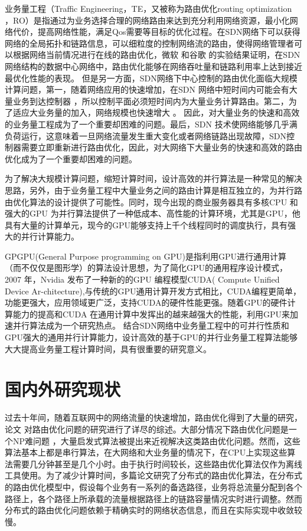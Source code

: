 \documentclass[master]{thesis-uestc}
\begin{document}
业务量工程（Traffic Engineering，TE，又被称为路由优化routing optimization ，RO）是指通过为业务选择合理的网络路由来达到充分利用网络资源，最小化网络代价，提高网络性能，满足Qos需要等目标的优化过程。在SDN网络下可以获得网络的全局拓扑和链路信息，可以细粒度的控制网络流的路由，使得网络管理者可以根据网络当前情况进行在线的路由优化，微软 \cite{Microsoft}和谷歌 \cite{Google}的实验结果证明，在SDN网络结构的数据中心网络中，路由优化能够在网络吞吐量和链路利用率上达到接近最优化性能的表现。
但是另一方面，SDN网络下中心控制的路由优化面临大规模计算问题，第一，随着网络应用的快速增加，在SDN 网络中短时间内可能会有大量业务到达控制器 \cite{application}，所以控制平面必须短时间内为大量业务计算路由。第二，为了适应大业务量的加入，网络规模也快速增大\cite{5G} \cite{DCN}。 因此，对大量业务的快速和高效的业务量工程成为了一个重要却困难的问题。最后，SDN 技术使网络能够几乎满负荷运行\cite{Secondrouting}，这意味着一旦网络流量发生重大变化或者网络链路出现故障，SDN控制器需要立即重新进行路由优化，因此，对大网络下大量业务的快速和高效的路由优化成为了一个重要却困难的问题。

为了解决大规模计算问题，缩短计算时间，设计高效的并行算法是一种常见的解决思路，另外，由于业务量工程中大量业务之间的路由计算是相互独立的，为并行路由优化算法的设计提供了可能性。同时，现今出现的商业服务器具有多核CPU 和强大的GPU 为并行算法提供了一种低成本、高性能的计算环境，尤其是GPU，他具有大量的计算单元，现今的GPU能够支持上千个线程同时的调度执行，具有强大的并行计算能力。

GPGPU(General Purpose programming on GPU)是指利用GPU进行通用计算（而不仅仅是图形学）的算法设计思想，为了简化GPU的通用程序设计模式，2007 年，Nvidia 发布了一种新的的GPU 编程模型CUDA( Compute Unified Device Ar-chitecture)\cite{CUDA},与传统的GPU通用计算开发方式相比，CUDA编程更简单，功能更强大，应用领域更广泛，支持CUDA的硬件性能更强。随着GPU的硬件计算能力的提高和CUDA 在通用计算中发挥出的越来越强大的性能，利用GPU来加速并行算法成为一个研究热点\cite{CUDAR}。
结合SDN网络中业务量工程中的可并行性质和GPU强大的通用并行计算能力，设计高效的基于GPU的并行业务量工程算法能够大大提高业务量工程计算时间，具有很重要的研究意义。
\section{国内外研究现状}
过去十年间，随着互联网中的网络流量的快速增加，路由优化得到了大量的研究，论文 \cite{TESurvey, TEDef, TESurvey1}对路由优化问题的研究进行了详尽的综述。大部分情况下路由优化问题是一个NP难问题 \cite{NP, multi-commodity}，大量启发式算法\cite{TESurvey, TEDef, TESurvey1}被提出来近视解决这类路由优化问题。然而，这些算法基本上都是串行算法，在大网络和大业务量的情况下，在CPU上实现这些算法需要几分钟甚至是几个小时\cite{SDNTE, ParaTE1, multi-commodity}。由于执行时间较长，这些路由优化算法仅作为离线工具使用\cite{Time}。为了减少计算时间，多篇论文\cite{mate, DATE}研究了分布式的路由优化算法，在分布式的路由优化模型中，假设每个业务有一系列的备选路径，业务将总流量分配到各个路径上，各个路径上所承载的流量根据路径上的链路容量情况实时进行调整。然而分布式的路由优化问题依赖于精确实时的网络状态信息，而且在实际实现中收敛较慢。
\end{document}
